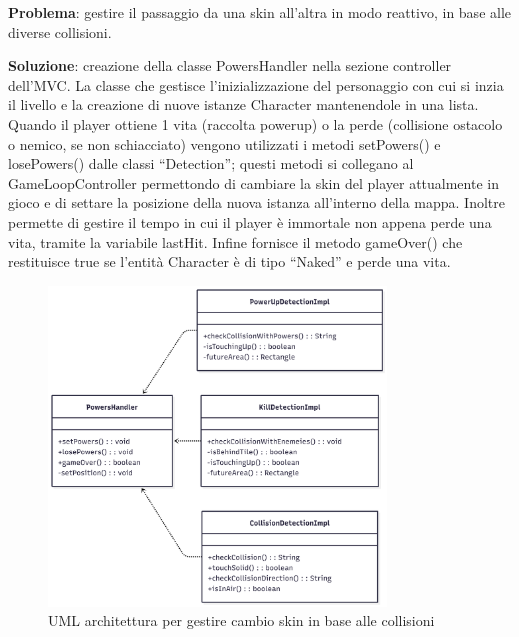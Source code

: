 \documentclass[a4paper,12pt]{report}
\begin{document}
\textbf{Problema}: gestire il passaggio da una skin all'altra in modo reattivo, in base alle diverse collisioni.\vspace{1cm}

\textbf{Soluzione}: creazione della classe PowersHandler nella sezione controller dell'MVC. La classe che gestisce l'inizializzazione del 
personaggio con cui si inzia il livello e la creazione di nuove istanze Character mantenendole in una lista. Quando il player ottiene 
1 vita (raccolta powerup) o la perde (collisione ostacolo o nemico, se non schiacciato) vengono utilizzati i metodi setPowers() e 
losePowers() dalle classi “Detection”; questi metodi si collegano al GameLoopController permettondo di cambiare la skin del player 
attualmente in gioco e di settare la posizione della nuova istanza all'interno della mappa. Inoltre permette di 
gestire il tempo in cui il player è immortale non appena perde una vita, tramite la variabile lastHit.
Infine fornisce il metodo gameOver() che restituisce true se l'entità Character è di tipo “Naked” e perde una vita.

\begin{figure}[H]
    \centering
    \includegraphics[width=0.8\textwidth]{resources/PowersHandler.png}
    \caption{UML architettura per gestire cambio skin in base alle collisioni}
    \label{fig:2.5}
\end{figure}
\end{document}
